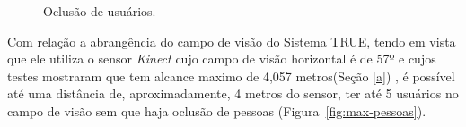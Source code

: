	\begin{figure}[htb]
	\begin{center}
		\end{center}
		\caption{Oclusão de usuários.}
		\label{fig:testes_oclusao}
	\end{figure}

	Com relação a abrangência do campo de visão do Sistema TRUE, tendo em vista que
	ele utiliza o sensor \textit{Kinect} cujo campo de visão horizontal é de 57º e
	cujos testes mostraram que tem alcance maximo de 4,057 metros(Seção \ref{a})
	, é possível até uma distância de, aproximadamente, 4 metros do sensor, ter
	até 5 usuários no campo de visão sem que haja oclusão de pessoas
	(Figura~\ref{fig:max-pessoas}).
	
	

